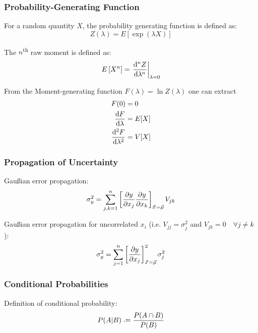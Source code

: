 		\subsubsection{Probability-Generating Function}
			\noindent
			For a random quantity $X$, the probability generating function is defined as:
			\begin{equation}
				Z(\lambda) = E\left[ \exp(\lambda X) \right]
			\end{equation}

			\noindent
			The $n$\textsuperscript{th} raw moment is defined as:
			\begin{equation}
				E\left[X^n\right] = \eval{\dv[n]{Z}{\lambda}}_{\lambda=0}
			\end{equation}

			\noindent
			From the Moment-generating function $F(\lambda)=\ln Z(\lambda)$ one can extract
			\begin{equation}
				\begin{aligned}
					F(0) &= 0 \\
					\dv{F}{\lambda}(0) &= E\qty[X] \\
					\dv[2]{F}{\lambda}(0) &= V\qty[X] \\
				\end{aligned}
			\end{equation}


		\subsubsection{Propagation of Uncertainty}
			\noindent
			Gaußian error propagation:
			\begin{equation}
				\sigma_y^2 = \sum_{j,k=1}^n \qty[\pdv{y}{x_j}\pdv{y}{x_k}]_{\vec{x}=\vec{\mu}} V_{jk}
			\end{equation}

			\noindent
			Gaußian error propagation for uncorrelated  $x_i$ (i.e. $V_{jj} = \sigma_{j}^2$ and $V_{jk} = 0 \quad\forall j\ne k$):
			\begin{equation}
				\sigma_y^2 = \sum_{j=1}^n \qty[\pdv{y}{x_j}]^2_{\vec{x}=\vec{\mu}} \sigma_j^2
			\end{equation}


		\subsubsection{Conditional Probabilities}
			\noindent
			Definition of conditional probability:
			\begin{equation}
				P(A|B) \defeq \frac{P(A \cap B)}{P(B)}
			\end{equation}

